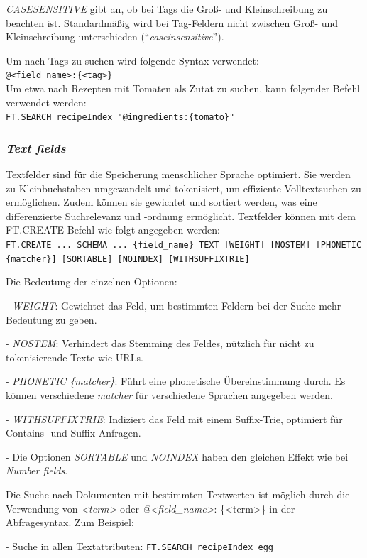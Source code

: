 \emph{CASESENSITIVE} gibt an, ob bei Tags die Groß- und Kleinschreibung zu beachten ist. Standardmäßig wird bei Tag-Feldern nicht zwischen Groß- und Kleinschreibung unterschieden (\enquote{\emph{caseinsensitive}}).

Um nach Tags zu suchen wird folgende Syntax verwendet:\\
\texttt{@<field\_name>:\{<tag>\}}\\
Um etwa nach Rezepten mit Tomaten als Zutat zu suchen, kann folgender Befehl verwendet werden:\\
\texttt{FT.SEARCH recipeIndex "@ingredients:\{tomato\}"}


\subsubsection{{\emph{Text fields}}}
Textfelder sind für die Speicherung menschlicher Sprache optimiert. Sie werden zu Kleinbuchstaben umgewandelt und tokenisiert, um effiziente Volltextsuchen zu ermöglichen. Zudem können sie gewichtet und sortiert werden, was eine differenzierte Suchrelevanz und -ordnung ermöglicht.
Textfelder können mit dem FT.CREATE Befehl wie folgt angegeben werden:\\
\texttt{FT.CREATE ... SCHEMA ... \{field\_name\} TEXT [WEIGHT] [NOSTEM] [PHONETIC \{matcher\}] [SORTABLE] [NOINDEX] [WITHSUFFIXTRIE]}

Die Bedeutung der einzelnen Optionen:

- \emph{WEIGHT}: Gewichtet das Feld, um bestimmten Feldern bei der Suche mehr Bedeutung zu geben.

- \emph{NOSTEM}: Verhindert das Stemming des Feldes, nützlich für nicht zu tokenisierende Texte wie URLs.

- \emph{PHONETIC \{matcher\}}: Führt eine phonetische Übereinstimmung durch. Es können verschiedene \emph{matcher} für verschiedene Sprachen angegeben werden.

- \emph{WITHSUFFIXTRIE}: Indiziert das Feld mit einem Suffix-Trie, optimiert für Contains- und Suffix-Anfragen.

- Die Optionen \emph{SORTABLE} und \emph{NOINDEX} haben den gleichen Effekt wie bei \emph{Number fields}.

Die Suche nach Dokumenten mit bestimmten Textwerten ist möglich durch die Verwendung von \emph{<term>} oder \emph{@<field\_name>}:
\{<term>\} in der Abfragesyntax. Zum Beispiel:

- Suche in allen Textattributen: \texttt{FT.SEARCH recipeIndex \glqq egg\grqq}

